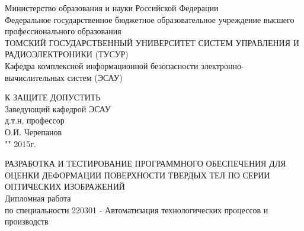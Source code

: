 \newpage
{}

\begin{center}
Министерство образования и науки Российской Федерации\\
Федеральное государственное бюджетное образовательное учреждение высшего профессионального образования\\
ТОМСКИЙ ГОСУДАРСТВЕННЫЙ УНИВЕРСИТЕТ СИСТЕМ УПРАВЛЕНИЯ И РАДИОЭЛЕКТРОНИКИ (ТУСУР)\\
Кафедра комплексной информационной безопасности электронно-вычислительных систем (ЭСАУ)\\
\end{center}

\hfill
\begin{minipage}[right]{0.4\linewidth}
\begin{singlespace}
 К ЗАЩИТЕ ДОПУСТИТЬ \\
 Заведующий кафедрой ЭСАУ \\
 д.т.н, профессор \\
 \underline{\hspace{2.5cm}}О.И. Черепанов \\
 "\underline{\hspace{1cm}}"\underline{\hspace{3cm}} 2015г.\\
\end{singlespace} 
\end{minipage}


\begin{center}
РАЗРАБОТКА И ТЕСТИРОВАНИЕ ПРОГРАММНОГО ОБЕСПЕЧЕНИЯ ДЛЯ ОЦЕНКИ ДЕФОРМАЦИИ ПОВЕРХНОСТИ ТВЕРДЫХ ТЕЛ ПО СЕРИИ ОПТИЧЕСКИХ ИЗОБРАЖЕНИЙ \\
Дипломная работа \\
по специальности 220301 - Автоматизация технологических процессов и производств\\
\vspace{1.5cm}
\end{center}


